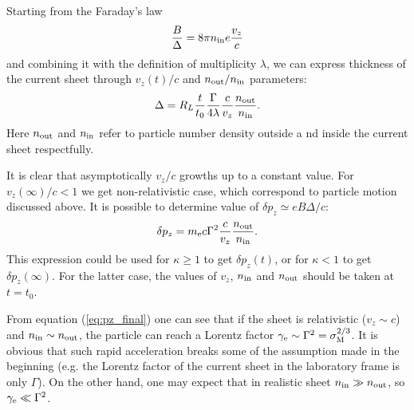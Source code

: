 \documentclass[useAMS,usenatbib]{mn2e}
\begin{document}
Starting from the Faraday's law
\begin{equation}
    \dfrac{B}{\Delta}=8\pi n_{\rm in} e \dfrac{v_z}{c}
\end{equation}
and combining it with the definition of multiplicity $\lambda$, we can express 
thickness of the current sheet through $v_{z}(t)/c$ and $n_{\rm out}/n_{\rm in}$ 
parameters:
\begin{equation}
\Delta=R_{L}\dfrac{t}{t_0}\dfrac{\Gamma}{4\lambda}\dfrac{c}{v_{z}}\dfrac{n_{\rm out}}{n_{\rm in}}.
\label{DD}
\end{equation}
Here $n_{\rm out}$ and $n_{\rm in}$ refer to particle number density outside a
nd inside the current sheet respectfully.

It is clear that asymptotically $v_{z}/c$ growths up to a constant value. For 
$v_{z}(\infty)/c<1$ we get non-relativistic case, which correspond to particle
motion discussed above. It is possible to determine value of 
$\delta p_{z}\simeq eB\Delta/c$:
 \begin{equation}
 \delta p_z = m_{\rm e}c \Gamma^2 \dfrac{c}{v_{z}}\dfrac{n_{\rm out}}{n_{\rm in}}.
 \label{eq:pz_final}
 \end{equation}
 This expression could be used for $\kappa \ge 1$ to get $\delta p_z(t)$, or for 
 $\kappa < 1$ to get $\delta p_z(\infty)$. For the latter case, the values of 
 $v_z$, $n_{\rm in}$ and $n_{\rm out}$ should be taken at $t = t_0$. 
 
 From equation (\ref{eq:pz_final}) one can see that if the sheet is relativistic 
 ($v_z \sim c$) and $n_{\rm in}\sim n_{\rm out}$, the particle can reach a Lorentz 
 factor $\gamma_{\rm e} \sim \Gamma^2 = \sigma_{\rm M}^{2/3}$. It is obvious that 
 such rapid acceleration breaks some of the assumption made in the beginning (e.g. 
 the Lorentz factor of the current sheet in the laboratory frame is only $\Gamma$).
 On the other hand, one may expect that in realistic sheet $n_{\rm in} \gg n_{\rm out}$, 
 so $\gamma_{\rm e} \ll \Gamma^2$. 
 
\end{document}
